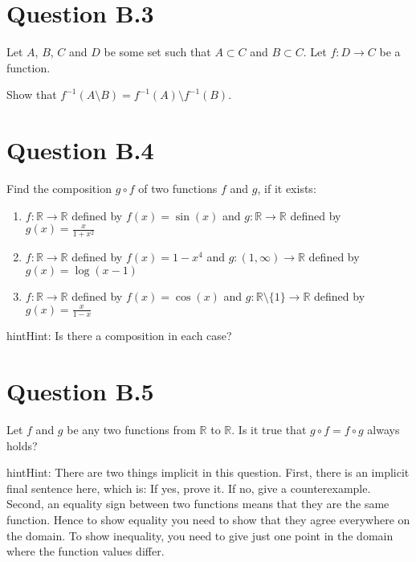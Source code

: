 \documentclass[letterpaper,10pt,english]{jupyterBook}
\begin{document}
\section{Question B.3}
\label{\detokenize{03.exercises.B:question-b-3}}
\sphinxAtStartPar
Let \(A\), \(B\), \(C\) and \(D\) be some set such that \(A \subset C\) and \(B \subset C\).
Let \(f\colon D \rightarrow C\) be a function.

\sphinxAtStartPar
Show that \(f^{-1}(A \setminus B) = f^{-1}(A) \setminus f^{-1}(B)\).


\section{Question B.4}
\label{\detokenize{03.exercises.B:question-b-4}}
\sphinxAtStartPar
Find the composition \(g \circ f\) of two functions \(f\) and \(g\), if it exists:
\begin{enumerate}
%
\item {} 
\sphinxAtStartPar
\(f \colon \mathbb{R} \rightarrow \mathbb{R}\) defined by \(f(x)=\sin(x)\) and \(g \colon \mathbb{R} \rightarrow \mathbb{R}\) defined by \(g(x)= \frac{x}{1+x^2}\)

\item {} 
\sphinxAtStartPar
\(f \colon \mathbb{R} \rightarrow \mathbb{R}\) defined by \(f(x)= 1-x^4\) and \(g \colon (1,\infty) \rightarrow \mathbb{R}\) defined by \(g(x)= \log(x-1)\)

\item {} 
\sphinxAtStartPar
\(f \colon \mathbb{R} \rightarrow \mathbb{R}\) defined by \(f(x)=\cos(x)\) and \(g \colon \mathbb{R}\setminus\{1\} \rightarrow \mathbb{R}\) defined by \(g(x)= \frac{x}{1-x}\)

\end{enumerate}

\begin{sphinxadmonition}{hint}{Hint:}
\sphinxAtStartPar
Is there a composition in each case?
\end{sphinxadmonition}


\section{Question B.5}
\label{\detokenize{03.exercises.B:question-b-5}}
\sphinxAtStartPar
Let \(f\) and \(g\) be any two functions from \(\mathbb{R}\) to \(\mathbb{R}\).  Is it true that
\(g \circ f = f \circ g\) always holds?

\begin{sphinxadmonition}{hint}{Hint:}
\sphinxAtStartPar
There are two
things implicit in this question.  First, there is an implicit final
sentence here, which is: If yes, prove it.  If no, give a
counterexample.  Second, an equality sign between two functions means
that they are the same function.  Hence to show equality you need to
show that they agree everywhere on the domain.  To show inequality,
you need to give just one point in the domain where the function
values differ.
\end{sphinxadmonition}
\end{document}
